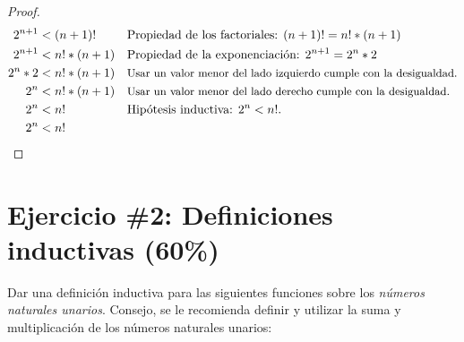 \documentclass[11pt,letterpaper]{article}
\begin{document}
\begin{enumerate}
\begin{proof}
\begin{align}
2^{n+1} &< (n+1)! && \text{Propiedad de los factoriales: $(n+1)! = n! * (n+1)$} \\
2^{n+1} &< n! * (n+1) && \text{Propiedad de la exponenciación: $2^{n+1} = 2^n * 2$} \\
2^n * 2 &< n! * (n+1) && \text{\small Usar un valor menor del lado izquierdo cumple con la desigualdad.} \\
2^n &< n! * (n+1) && \text{\small Usar un valor menor del lado derecho cumple con la desigualdad.} \\
2^n &< n! && \text{Hipótesis inductiva: $2^n < n!$.} \\
2^n &< n!
\end{align}
\end{proof}
\end{enumerate}
\pagebreak

\section*{Ejercicio \#2: Definiciones inductivas (60\%)}
\noindent Dar una definición inductiva para las siguientes funciones sobre los \emph{números naturales unarios}. Consejo, se le recomienda definir y utilizar la suma y multiplicación de los números naturales unarios:
\end{document}
